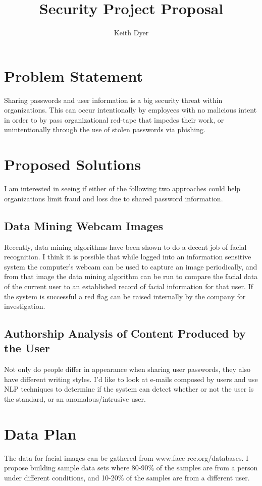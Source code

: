 \documentclass[]{article}
\title{Security Project Proposal}
\author{Keith Dyer}
\begin{document}
\maketitle

\section*{Problem Statement}

Sharing passwords and user information is a big security threat within organizations. This can occur intentionally by employees with no malicious intent in order to by pass organizational red-tape that impedes their work, or unintentionally through the use of stolen passwords via phishing.

\section*{Proposed Solutions}

I am interested in seeing if either of the following two approaches could help organizations limit fraud and loss due to shared password information.

\subsection*{Data Mining Webcam Images}

Recently, data mining algorithms have been shown to do a decent job of facial recognition. I think it is possible that while logged into an information sensitive system the computer's webcam can be used to capture an image periodically, and from that image the data mining algorithm can be run to compare the facial data of the current user to an established record of facial information for that user. If the system is successful a red flag can be raised internally by the company for investigation. 

\subsection*{Authorship Analysis of Content Produced by the User}

Not only do people differ in appearance when sharing user passwords, they also have different writing styles. I'd like to look at e-mails composed by users and use NLP techniques to determine if the system can detect whether or not the user is the standard, or an anomalous/intrusive user.

\section*{Data Plan}
The data for facial images can be gathered from www.face-rec.org/databases. I propose building sample data sets where 80-90\% of the samples are from a person under different conditions, and 10-20\% of the samples are from a different user. 
\end{document}
